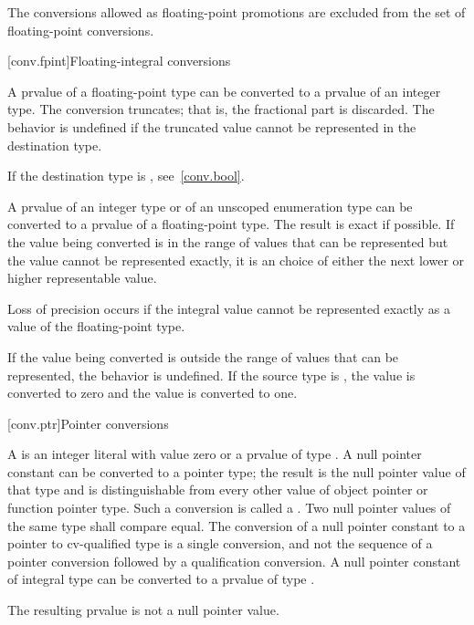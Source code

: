 \pnum
The conversions allowed as floating-point promotions are excluded from
the set of floating-point conversions.

[conv.fpint]{Floating-integral conversions}

\pnum
{}%
A prvalue of a floating-point type can be converted to a prvalue of an
integer type. The conversion truncates; that is, the fractional part is
discarded.
%
The behavior is undefined if the truncated value cannot be represented
in the destination type.
\begin{note}
If the destination type is , see~\ref{conv.bool}.
\end{note}

\pnum
{}%
%
%
A prvalue of an integer type or of an unscoped enumeration type can be converted to
a prvalue of a floating-point type. The result is exact if possible. If the value being
converted is in the range of values that can be represented but the value cannot be
represented exactly, it is an  choice of either the next lower or higher representable
value.
\begin{note}
Loss of precision occurs if the integral value cannot be represented
exactly as a value of the floating-point type.
\end{note}
If the value being converted is
outside the range of values that can be represented, the behavior is undefined. If the
source type is , the value  is converted to zero and the value
 is converted to one.

[conv.ptr]{Pointer conversions}

\pnum
{}%
%
%
%
A  is an integer literal with
value zero
or a prvalue of type . A null pointer constant can be
converted to a pointer type; the
result is the null pointer value of that type and is
distinguishable from every other value of
object pointer or function pointer
type.
Such a conversion is called a .
Two null pointer values of the same type shall compare
equal. The conversion of a null pointer constant to a pointer to
cv-qualified type is a single conversion, and not the sequence of a
pointer conversion followed by a qualification
conversion. A null pointer constant of integral type
can be converted to a prvalue of type .
\begin{note}
The resulting prvalue is not a null pointer value.
\end{note}

